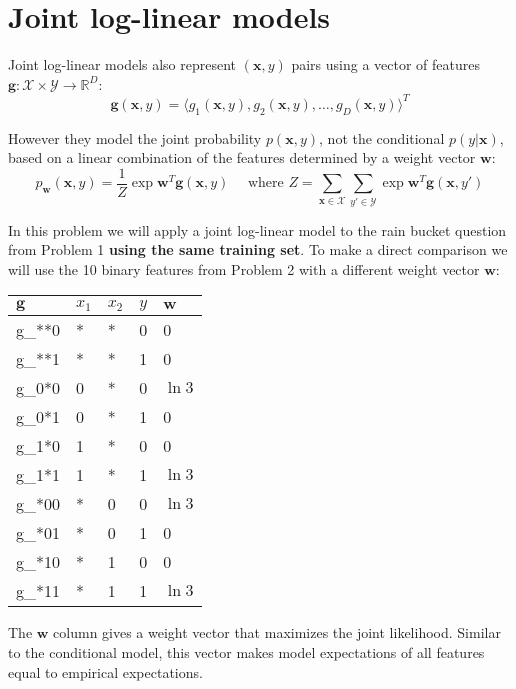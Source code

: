 \documentclass[a4paper,fleqn]{article}
\renewcommand{\vec}{\mathbf}
\begin{document}
\newpage
\section{Joint log-linear models}

Joint log-linear models also represent $(\vec{x}, y)$ pairs using a
vector of features $\vec{g}: \mathcal{X} \times \mathcal{Y}
\rightarrow \mathbb{R}^D$:
\[ \vec{g}(\vec{x}, y) = \langle g_1(\vec{x}, y), g_2(\vec{x}, y), \dots, g_D(\vec{x}, y) \rangle^T \]

However they model the joint probability $p(\vec{x},y)$, not the
conditional $p(y|\vec{x})$, based on a linear combination of the
features determined by a weight vector $\vec{w}$:
\[ p_\vec{w}(\vec{x},y) = \frac{1}{Z}
\exp \vec{w}^T \vec{g}(\vec{x}, y)
\quad\text{ where }
Z = \sum_{\vec{x}\in\mathcal{X}}
\sum_{y'\in\mathcal{Y}} 
\exp \vec{w}^T \vec{g}(\vec{x}, y')
\]

In this problem we will apply a joint log-linear model to the rain
bucket question from Problem 1 {\bf using the same training set}.  To
make a direct comparison we will use the 10 binary features from
Problem 2 with a different weight vector $\vec{w}$:

\begin{center}
\begin{tabular}{lllll}
$\vec{g}$ & $x_1$ & $x_2$ & $y$ & $\vec{w}$ \\ \hline
g_{**0} & * & * & 0 & 0\\
g_{**1} & * & * & 1 & 0\\
g_{0*0} & 0 & * & 0 & $\ln 3$\\
g_{0*1} & 0 & * & 1 & 0\\
g_{1*0} & 1 & * & 0 & 0\\
g_{1*1} & 1 & * & 1 & $\ln 3$\\
g_{*00} & * & 0 & 0 & $\ln 3$\\
g_{*01} & * & 0 & 1 & 0\\
g_{*10} & * & 1 & 0 & 0\\
g_{*11} & * & 1 & 1 & $\ln 3$\\
\end{tabular}
\end{center}

The $\vec{w}$ column gives a weight vector that maximizes the joint
likelihood.  Similar to the conditional model, this vector makes model
expectations of all features equal to empirical expectations.
\end{document}
